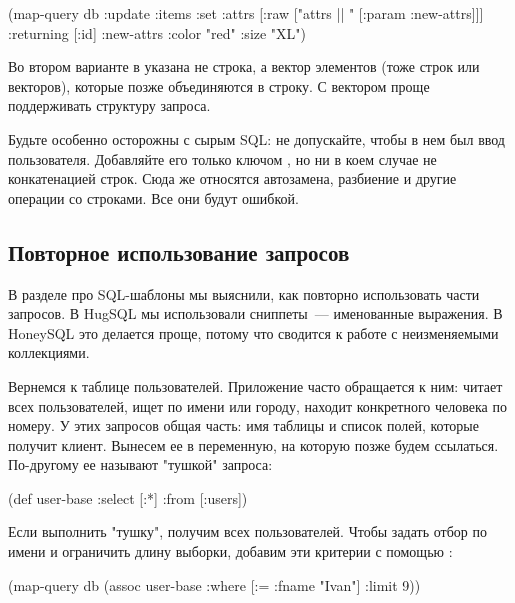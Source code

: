 \begin{english}
  \begin{clojure}
(map-query
 db
 {:update :items
  :set {:attrs [:raw ["attrs || " [:param :new-attrs]]]}
  :returning [:id]}
 {:new-attrs {:color "red" :size "XL"}})
  \end{clojure}
\end{english}

Во втором варианте в  указана не строка, а вектор элементов (тоже строк или векторов), которые позже объединяются в строку. С вектором проще поддерживать структуру запроса.

Будьте особенно осторожны с сырым SQL: не допускайте, чтобы в нем был ввод пользователя. Добавляйте его только ключом , но ни в коем случае не конкатенацией строк. Сюда же относятся автозамена, разбиение и другие операции со строками. Все они будут ошибкой.

\subsection{Повторное использование запросов}

В разделе про SQL-шаблоны мы выяснили, как повторно использовать части запросов. В HugSQL мы использовали сниппеты~--- именованные выражения. В HoneySQL это делается проще, потому что сводится к работе с неизменяемыми коллекциями.

Вернемся к таблице пользователей. Приложение часто обращается к ним: читает всех пользователей, ищет по имени или городу, находит конкретного человека по номеру. У этих запросов общая часть: имя таблицы и список полей, которые получит клиент. Вынесем ее в переменную, на которую позже будем ссылаться. По-другому ее называют "тушкой" запроса:

\begin{english}
  \begin{clojure}
(def user-base
  {:select [:*]
   :from [:users]})
  \end{clojure}
\end{english}

Если выполнить "тушку", получим всех пользователей. Чтобы задать отбор по имени и ограничить длину выборки, добавим эти критерии с помощью :

\begin{english}
  \begin{clojure}
(map-query db (assoc user-base
                     :where [:= :fname "Ivan"]
                     :limit 9))
  \end{clojure}
\end{english}

